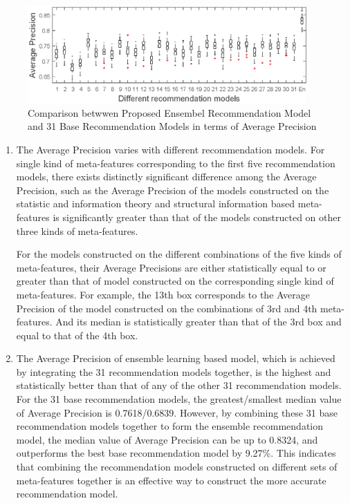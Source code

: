 \documentclass[prodmode,acmtkdd]{acmsmall}
\begin{document}
\begin{figure}[!h]
	\centering
	\includegraphics[width=0.95\textwidth]{Figures/MeanPrecisionComparison}
	\caption{Comparison betwwen Proposed Ensembel Recommendation Model and 31 Base Recommendation Models in terms of Average Precision}\label{Fig:CompOnMeanPrecision}
\end{figure}
\begin{enumerate}
    \item The Average Precision varies with different recommendation
    models. For single kind of meta-features corresponding to the
    first five recommendation models, there exists distinctly
    significant difference among the Average Precision, such as the
    Average Precision of the models constructed on the statistic and
    information theory and structural information based
    meta-features is significantly greater than that of the models
    constructed on other three kinds of meta-features.

    \quad For the models constructed on the different combinations
    of the five kinds of meta-features, their Average Precisions are
    either statistically equal to or greater than that of model
    constructed on the corresponding single kind of meta-features.
    For example, the 13th box corresponds to the Average Precision
    of the model constructed on the combinations of  3rd and 4th
    meta-features. And its median is statistically greater than that of the 3rd box and equal to that of the 4th box.

    \item The Average Precision of ensemble learning based model, which is
    achieved by integrating the 31 recommendation models together, is the
    highest and statistically better than that of any of the other 31
    recommendation models. For the 31 base recommendation models, the
    greatest/smallest median value of Average Precision is 0.7618/0.6839.
    However, by combining these 31 base recommendation models together
    to form the ensemble recommendation model, the median value of
    Average Precision can be up to 0.8324, and outperforms the best base
    recommendation model by 9.27\%. This indicates that combining the
    recommendation models constructed on different sets of
    meta-features together is an effective way to construct the more accurate
    recommendation model.
\end{enumerate}
\end{document}
